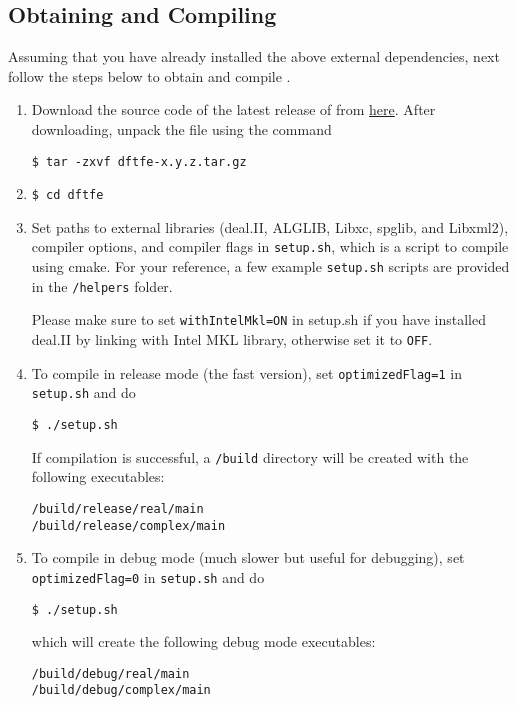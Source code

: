 \subsection{Obtaining and Compiling \dftfe{}}
Assuming that you have already installed the above external dependencies, next follow the steps below to obtain and compile \dftfe{}.
\begin{enumerate}
\item Download the source code of the latest release of \dftfe{} from \href{https://sites.google.com/umich.edu/dftfe/download}{here}. After downloading, unpack the file using the command
\begin{verbatim}
$ tar -zxvf dftfe-x.y.z.tar.gz
\end{verbatim}


\item   \begin{verbatim}
$ cd dftfe
\end{verbatim}


\item Set paths to external libraries (deal.II, ALGLIB, Libxc, spglib, and Libxml2), compiler options, and compiler flags in \verb|setup.sh|, which is a script to compile \dftfe{} using cmake. For your reference, a few example \verb|setup.sh| scripts are provided in the \verb|/helpers| folder. 
	
Please make sure to set \verb|withIntelMkl=ON| in setup.sh if you have installed deal.II by linking with Intel MKL library, otherwise set it to \verb|OFF|. 

\item To compile \dftfe{} in release mode (the fast version), set \verb|optimizedFlag=1| in \verb|setup.sh| and do
\begin{verbatim}
$ ./setup.sh
\end{verbatim} 
If compilation is successful, a \verb|/build| directory will be created with the following executables:
\begin{verbatim}
/build/release/real/main
/build/release/complex/main
\end{verbatim}

\item
To compile \dftfe{} in debug mode (much slower but useful for debugging), set \verb|optimizedFlag=0| in \verb|setup.sh| and do
\begin{verbatim}
$ ./setup.sh
\end{verbatim}
which will create the following debug mode executables:
\begin{verbatim}
/build/debug/real/main
/build/debug/complex/main
\end{verbatim}
\end{enumerate}
